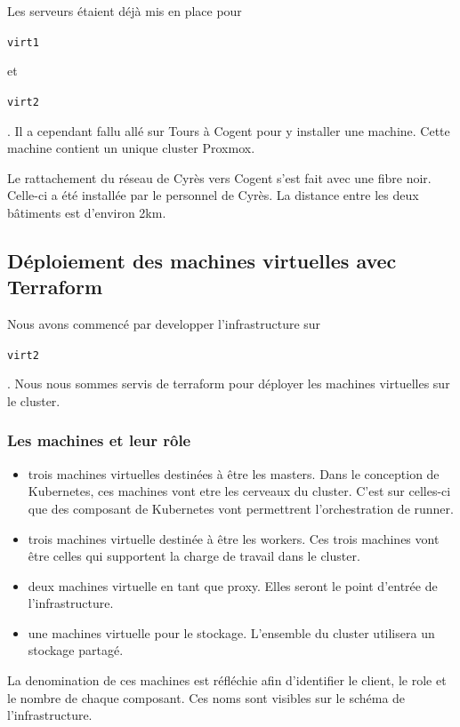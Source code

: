 \documentclass[12pt, a4paper, twoside]{article}
\begin{document}
Les serveurs étaient déjà mis en place pour \begin{code}\texttt{virt1}\end{code} et \begin{code}\texttt{virt2}\end{code}. 
Il a cependant fallu allé sur Tours à Cogent pour y installer une machine. 
Cette machine contient un unique \gls{cluster} \gls{Proxmox}. 

Le rattachement du réseau de Cyrès vers Cogent s'est fait avec une fibre noir.
Celle-ci a été installée par le personnel de Cyrès.
La distance entre les deux bâtiments est d'environ 2km.

\subsection{Déploiement des machines virtuelles avec Terraform}
Nous avons commencé par developper l'infrastructure sur \begin{code}\texttt{virt2}\end{code}. 
Nous nous sommes servis de terraform pour déployer les machines virtuelles sur le \gls{cluster}. 

\subsubsection{Les machines et leur rôle}
\begin{itemize}
    \item trois machines virtuelles destinées à être les masters. 
    Dans le conception de \gls{Kubernetes}, ces machines vont etre les cerveaux du \gls{cluster}.
    C'est sur celles-ci que des composant de \gls{Kubernetes} vont permettrent l'orchestration de runner.
    \item trois machines virtuelle destinée à être les workers. 
    Ces trois machines vont être celles qui supportent la charge de travail dans le \gls{cluster}.
    \item deux machines virtuelle en tant que proxy. 
    Elles seront le point d'entrée de l'infrastructure. 
    \item une machines virtuelle pour le stockage. 
    L'ensemble du \gls{cluster} utilisera un stockage partagé.
\end{itemize}

La denomination de ces machines est réfléchie afin d'identifier le client, le role et le nombre de chaque composant. 
Ces noms sont visibles sur le schéma de l'infrastructure.
\end{document}
